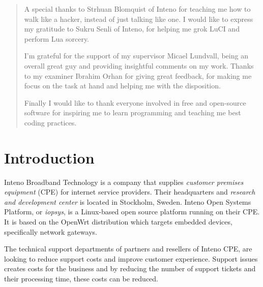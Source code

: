 \documentclass[g5paper,11pt]{kth-bcs}
\newcommand\blankpage{%
    \null
    \thispagestyle{empty}%
    \addtocounter{page}{-1}%
    \newpage}
\begin{document}
\renewcommand{\abstractname}{Acknowledgements}
\begin{abstract}
A special thanks to Strhuan Blomquist of Inteno for teaching me how to walk like a hacker, instead of just talking like one.
I would like to express my gratitude to Sukru Senli of Inteno, for helping me grok LuCI and perform Lua sorcery.

I'm grateful for the support of my supervisor Micael Lundvall, being an overall great guy and providing insightful comments on my work.
Thanks to my examiner Ibrahim Orhan for giving great feedback, for making me focus on the task at hand and helping me with the disposition.

Finally I would like to thank everyone involved in free and open-source software for inspiring me to learn programming and teaching me best coding practices.
\newpage
\blankpage
\end{abstract}
\clearpage

\tableofcontents*
\mainmatter
\pagestyle{newchap}
\chapter{Introduction}
Inteno Broadband Technology is a company that supplies \emph{customer premises equipment} (CPE) for internet service providers.  
Their headquarters and \emph{research and development center} is located in Stockholm, Sweden.
Inteno Open Systems Platform, or \emph{iopsys}, is a Linux-based open source platform running on their CPE.
It is based on the OpenWrt distribution which targets embedded devices, specifically network gateways.\cite{Inteno}

The technical support departments of partners and resellers of Inteno CPE, are looking to reduce support costs and improve customer experience. 
Support issues creates costs for the business and by reducing the number of support tickets and their processing time, these costs can be reduced.
\end{document}
